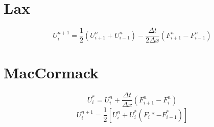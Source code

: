 \documentclass[10pt]{article}
\begin{document}
\section{Lax}
\begin{equation}
	U_i^{n+1} = \dfrac{1}{2}\left(U_{i+1}^n+U_{i-1}^n\right) - \dfrac{\Delta t}{2\Delta x}\left(F_{i+1}^n - F_{i-1}^n\right)
\end{equation}
\section{MacCormack}
\begin{equation}
	U_i^* = U_i^n + \dfrac{\Delta t}{\Delta x}\left(F_{i+1}^n - F_i^n \right)
\end{equation}
\begin{equation}
	U_i^{n+1} = \dfrac{1}{2}\left[U_i^n + U_i^*\left(F_i* - F_{i-1}^*\right)\right]
\end{equation}
\end{document}
